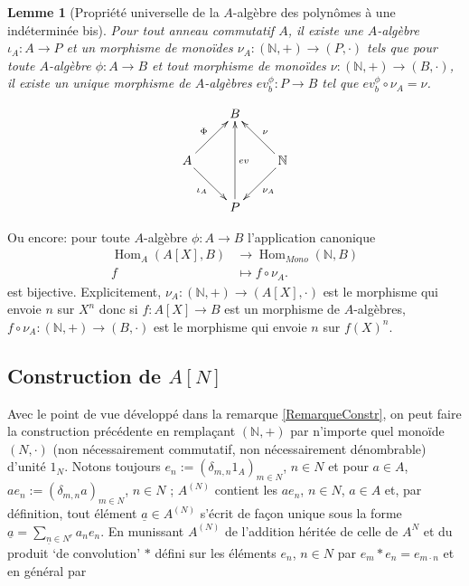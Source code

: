 \documentclass[a4paper, oneside, 12pt]{book}
\theoremstyle{theoremeStyle} %
\newtheorem{lemme}[theoreme]{Lemme}
\theoremstyle{definition} %
\DeclareMathOperator{\SHom}{Hom}
\newcommand{\N}{\mathbb{N}}
\begin{document}
  \begin{lemme}[Propriété universelle de la $A$-algèbre des polynômes à une indéterminée bis]Pour tout anneau commutatif $A$, il existe une $A$-algèbre $\iota_A: A\rightarrow P$ et un morphisme de monoïdes $\nu_A:(\N,+)\rightarrow (P,\cdot)$ tels que pour toute $A$-algèbre $\phi: A\rightarrow B$ et tout morphisme de monoïdes $\nu:(\N,+)\rightarrow (B,\cdot)$, il existe un unique  morphisme de $A$-algèbres $ev^\phi_b:P\rightarrow B$  tel que $ ev^\phi_b\circ \nu_A=\nu$.\end{lemme}

  $$ \xymatrix{ & B \\ A \ar[ru]^\Phi \ar[rd]_{\iota_A} & & \mathbb{N} \ar[lu]_\nu \ar[ld]^{\nu_A} \\ & P \ar[uu]_{ev} } $$

 Ou encore: pour toute $A$-algèbre $\phi:A\rightarrow B$  l'application canonique
\begin{align}\SHom_A(A[X],B) &\to \SHom_{Mono}(\N,B) \\ f &\mapsto f\circ \nu_A.\end{align}
 est bijective. Explicitement, $\nu_A:(\N,+)\rightarrow (A[X],\cdot)$ est le morphisme qui envoie $n$ sur $X^n$ donc si $f:A[X]\rightarrow B$ est un morphisme de $A$-algèbres, $f\circ \nu_A:(\N,+)\rightarrow (B,\cdot)$  est le morphisme qui envoie $n$ sur $f(X)^n$.\\

 \subsection{Construction de $A[N]$}

  Avec le point de vue développé dans la remarque \ref{RemarqueConstr}, on peut faire la construction précédente en remplaçant $(\N,+)$ par n'importe quel monoïde $(N,\cdot)$ (non nécessairement commutatif, non nécessairement dénombrable) d'unité $1_N$.   Notons toujours $e_{n}:=(\delta_{m,n}1_{A})_{m\in N}$, $n\in N$ et pour $a\in A$, $ae_{n}:=(\delta_{m,n}a)_{m\in  N}$, $n\in N$ ; $A^{(N)}$ contient les $ae_{n}$, $n\in N$, $a\in A$ et, par définition,  tout élément $\underline{a}\in A^{(N)}$ s'écrit de façon unique sous la forme $\underline{a}=\sum_{\underline{n}\in N^r}a_ne_{n}$. En munissant $A^{(N)}$ de l'addition héritée de celle de $A^{N}$ et du produit `de convolution' $*$ défini sur les éléments $e_{n}$, $n\in N$ par
$e_{m}*e_{n}=e_{m\cdot n} $ et en général par
\end{document}
